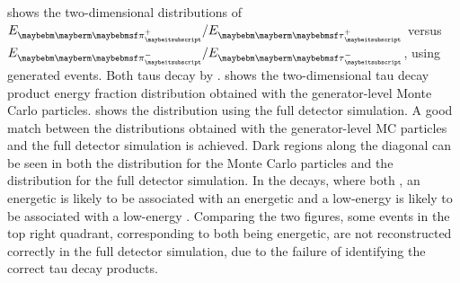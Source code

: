 


 shows the two-dimensional distributions of $E_{\Ppiplus} / E_{\APtauon}$ versus $E_{\Ppiminus} / E_{\Ptauon}$, using generated \eeZZQQ events. Both taus decay by \tauToPionBoth.  shows the  two-dimensional  tau decay product energy fraction distribution obtained with the generator-level  Monte Carlo particles.  shows the distribution using the full detector simulation. A good match between the distributions obtained with  the generator-level  MC particles and the full detector simulation is achieved. Dark regions along the diagonal can be seen in both the distribution for the Monte Carlo particles and the distribution for the full detector simulation. In the \ZToTauTau decays, where both \tauToPionBoth, an energetic \Pgppm is likely to be associated with an energetic \Pgpmp and a low-energy \Pgppm is  likely to be associated with a low-energy \Pgpmp. Comparing the two figures, some events in the top right quadrant, corresponding to  both \Ppipm being energetic, are not reconstructed correctly in the full detector simulation, due to the failure of identifying the correct tau decay products.


